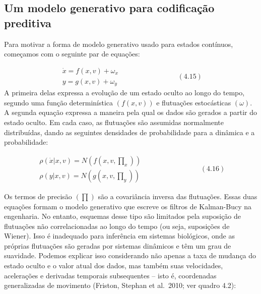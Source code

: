 \documentclass[
  12pt,
]{book}
\begin{document}
\hypertarget{um-modelo-generativo-para-codificauxe7uxe3o-preditiva}{%
\subsection{Um modelo generativo para codificação preditiva}\label{um-modelo-generativo-para-codificauxe7uxe3o-preditiva}}

Para motivar a forma de modelo generativo usado para estados contínuos,
começamos com o seguinte par de equações:

\[ \begin{matrix} \dot x = f(x,v) + \omega_x \\
 y = g (x,v) + \omega_y  \end{matrix}  \qquad\qquad\qquad\qquad (4.15) \]
A primeira delas expressa a evolução de um estado oculto ao longo do
tempo, segundo uma função determinística \(( f (x, v))\) e flutuações
estocásticas \((ω)\). A segunda equação expressa a maneira pela qual os
dados são gerados a partir do estado oculto. Em cada caso, as flutuações
são assumidas normalmente distribuídas, dando as seguintes densidades de
probabilidade para a dinâmica e a probabilidade:

\[ \begin{matrix}  
\rho(\dot x | x,v) = N(f(x,v, \prod_x)) \\
 \rho(y | x,v) = N(g(x,v, \prod_y)) 
 \end{matrix}  \qquad\qquad\qquad\qquad (4.16) \]

Os termos de precisão \((\prod)\) são a covariância inversa das
flutuações. Essas duas equações formam o modelo generativo que escreve
os filtros de Kalman-Bucy na engenharia. No entanto, esquemas desse tipo
são limitados pela suposição de flutuações não correlacionadas ao longo
do tempo (ou seja, suposições de Wiener). Isso é inadequado para
inferência em sistemas biológicos, onde as próprias flutuações são
geradas por sistemas dinâmicos e têm um grau de suavidade. Podemos
explicar isso considerando não apenas a taxa de mudança do estado oculto
e o valor atual dos dados, mas também suas velocidades, acelerações e
derivadas temporais subsequentes -- isto é, coordenadas generalizadas de
movimento (Friston, Stephan et al.~2010; ver quadro 4.2):
\end{document}
